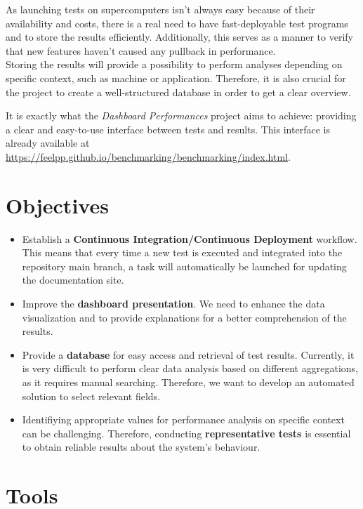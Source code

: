 \documentclass[12pt]{article}
\begin{document}
\newpage
As launching tests on supercomputers isn't always easy because of their availability and costs, there is a real need to have fast-deployable test programs and to store the results efficiently.
Additionally, this serves as a manner to verify that new features haven't caused any pullback in performance. \\
Storing the results will provide a possibility to perform analyses depending on specific context, such as machine or application.
Therefore, it is also crucial for the project to create a well-structured database in order to get a clear overview.

It is exactly what the \textit{Dashboard Performances} project aims to achieve: providing a clear and easy-to-use interface between tests and results.
This interface is already available at \url{https://feelpp.github.io/benchmarking/benchmarking/index.html}.

\vspace{1cm}
\section{Objectives}
\begin{itemize}
    \item Establish a \textbf{Continuous Integration/Continuous Deployment} workflow.
    This means that every time a new test is executed and integrated into the repository main branch, a task will automatically be launched for updating the documentation site. \\
    \item Improve the \textbf{dashboard presentation}. We need to enhance the data visualization and to provide explanations for a better comprehension of the results. \\
    \item Provide a \textbf{database} for easy access and retrieval of test results.
    Currently, it is very difficult to perform clear data analysis based on different aggregations, as it requires manual searching.
    Therefore, we want to develop an automated solution to select relevant fields.
    \item Identifiying appropriate values for performance analysis on specific context can be challenging. Therefore, conducting \textbf{representative tests} is essential to obtain reliable results about the system's behaviour. \\
\end{itemize}

\newpage
\section{Tools}
\end{document}
